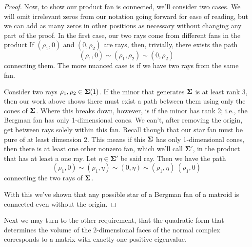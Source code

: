 \documentclass[12pt,oneside]{../../sfsuthesis}
\begin{document}
\begin{proof}
    Now, to show our product fan is connected, we'll consider two cases.
    We will omit irrelevant zeros from our notation going forward for ease of reading, but we can add as many zeros in other positions as necessary without changing any part of the proof.
    In the first case, our two rays come from different fans in the product
    If \( (\rho_1, 0) \) and \( (0, \rho_2) \) are rays, then, trivially, there exists the path
    \[
        (\rho_1, 0) \sim (\rho_1, \rho_2) \sim (0, \rho_2)
    \]
    connecting them.
    The more nuanced case is if we have two rays from the same fan.

    Consider two rays \( \rho_1, \rho_2 \in \bm{\Sigma}(1)\).
    If the minor that generates \( \bm{\Sigma} \) is at least rank 3, then our work above shows there must exist a path between them using only the cones of \( \bm{\Sigma} \).
    Where this breaks down, however, is if the minor has rank 2; i.e., the Bergman fan has only 1-dimensional cones.
    We can't, after removing the origin, get between rays solely within this fan.
    Recall though that our star fan must be pure of at least dimension 2.
    This means if this \(\bm{\Sigma} \) has only 1-dimensional cones, then there is at least one other nonzero fan, which we'll call \( \bm{\Sigma'} \), in the product that has at least a one ray.
    Let \( \eta \in  \bm{\Sigma'} \) be said ray.
    Then we have the path
    \[
        (\rho_1, 0) \sim (\rho_1, \eta) \sim (0, \eta) \sim (\rho_1, \eta) ~ (\rho_1, 0)
    \]
    connecting the two rays of \( \bm{\Sigma} \).

    With this we've shown that any possible star of a Bergman fan of a matroid is connected even without the origin.
\end{proof}

Next we may turn to the other requirement, that the quadratic form that determines the volume of the 2-dimensional faces of the normal complex corresponds to a matrix with exactly one positive eigenvalue.
\end{document}
